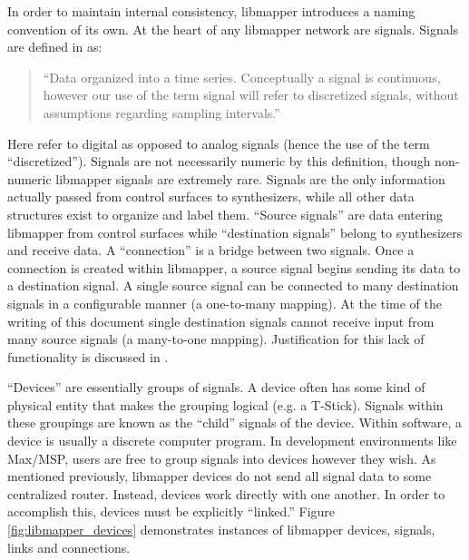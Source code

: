 In order to maintain internal consistency, libmapper introduces a naming convention of its own. At the heart of any libmapper network are signals. Signals are defined in  as:
\begin{quote}
``Data organized into a time series. Conceptually a signal is continuous, however our use of the term signal will refer to discretized signals, without assumptions regarding sampling intervals.''
\end{quote}
Here  refer to digital as opposed to analog signals (hence the use of the term ``discretized''). Signals are not necessarily numeric by this definition, though non-numeric libmapper signals are extremely rare. Signals are the only information actually passed from control surfaces to synthesizers, while all other data structures exist to organize and label them. ``Source signals'' are data entering libmapper from control surfaces while ``destination signals'' belong to synthesizers and receive data. A ``connection'' is a bridge between two signals. Once a connection is created within libmapper, a source signal begins sending its data to a destination signal. A single source signal can be connected to many destination signals in a configurable manner (a one-to-many mapping). At the time of the writing of this document single destination signals cannot receive input from many source signals (a many-to-one mapping). Justification for this lack of functionality is discussed in .

``Devices'' are essentially groups of signals. A device often has some kind of physical entity that makes the grouping logical (e.g. a T-Stick). Signals within these groupings are known as the ``child'' signals of the device. Within software, a device is usually a discrete computer program. In development environments like Max/MSP, users are free to group signals into devices however they wish. As mentioned previously, libmapper devices do not send all signal data to some centralized router. Instead, devices work directly with one another. In order to accomplish this, devices must be explicitly ``linked.'' Figure \ref{fig:libmapper_devices} demonstrates instances of libmapper devices, signals, links and connections.
 
